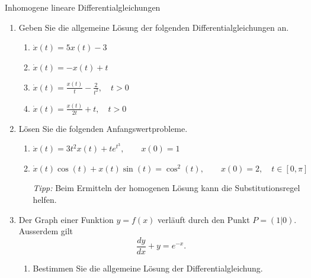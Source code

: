 \begin{ueb}{Inhomogene lineare Differentialgleichungen}{}
    \begin{enumerate}
        \item Geben Sie die allgemeine Lösung der folgenden
              Differentialgleichungen an.

              \begin{enumerate}
                  \item \(\displaystyle
                        \dot{x}(t)=5x(t)-3\)

                  \item \(\displaystyle
                        \dot{x}(t)=-x(t)+t\)

                  \item \(\displaystyle
                        \dot{x}(t)=\frac{x(t)}{t}
                        -\frac{2}{t^2},
                        \quad t>0\)

                  \item \(\displaystyle
                        \dot{x}(t)=\frac{x(t)}{2t}+t,
                        \quad t>0\)
              \end{enumerate}

        \item Lösen Sie die folgenden Anfangswertprobleme.

              \begin{enumerate}
                  \item \(\displaystyle
                        \dot{x}(t)=3t^2x(t)+te^{t^3},
                        \qquad x(0)=1\)

                  \item \(\displaystyle
                        \dot{x}(t)\cos(t)
                        +x(t)\sin(t)=\cos^2(t),
                        \qquad x(0)=2,
                        \quad t\in[0,\pi]\)

                        \emph{Tipp:} Beim Ermitteln der
                        homogenen Lösung kann die
                        Substitutionsregel helfen.
              \end{enumerate}

        \item Der Graph einer Funktion \(y=f(x)\)
              verläuft durch den Punkt \(P=(1|0)\).
              Ausserdem gilt
              \[
                  \frac{dy}{dx}+y=e^{-x}.
              \]

              \begin{enumerate}
                  \item Bestimmen Sie die allgemeine Lösung
                        der Differentialgleichung.


\end{enumerate}
\end{enumerate}
\end{ueb}
